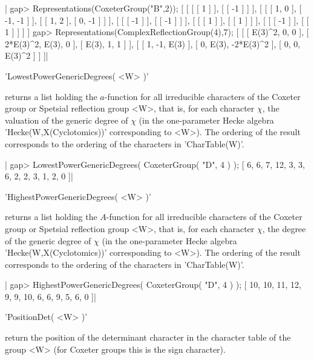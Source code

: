 |    gap> Representations(CoxeterGroup("B",2));
    [ [ [ [ 1 ] ], [ [ -1 ] ] ],
      [ [ [ 1, 0 ], [ -1, -1 ] ], [ [ 1, 2 ], [ 0, -1 ] ] ],
      [ [ [ -1 ] ], [ [ -1 ] ] ], [ [ [ 1 ] ], [ [ 1 ] ] ],
      [ [ [ -1 ] ], [ [ 1 ] ] ] ]
    gap> Representations(ComplexReflectionGroup(4),7);
    [ [ [ E(3)^2, 0, 0 ], [ 2*E(3)^2, E(3), 0 ], [ E(3), 1, 1 ] ],
      [ [ 1, -1, E(3) ], [ 0, E(3), -2*E(3)^2 ], [ 0, 0, E(3)^2 ] ] ]|


'LowestPowerGenericDegrees( <W> )'

returns  a list holding the $a$-function  for all irreducible characters of
the  Coxeter  group  or  Spetsial  reflection  group <W>, that is, for each
character  $\chi$, the  valuation of  the generic  degree of $\chi$ (in the
one-parameter  Hecke  algebra  'Hecke(W,X(Cyclotomics))'  corresponding  to
<W>).  The  ordering  of  the  result  corresponds  to  the ordering of the
characters in 'CharTable(W)'.

|    gap> LowestPowerGenericDegrees( CoxeterGroup( "D", 4 ) );
    [ 6, 6, 7, 12, 3, 3, 6, 2, 2, 3, 1, 2, 0 ]|


'HighestPowerGenericDegrees( <W> )'

returns  a list holding the $A$-function  for all irreducible characters of
the  Coxeter  group  or  Spetsial  reflection  group <W>, that is, for each
character  $\chi$,  the  degree  of  the  generic  degree of $\chi$ (in the
one-parameter  Hecke  algebra  'Hecke(W,X(Cyclotomics))'  corresponding  to
<W>).  The  ordering  of  the  result  corresponds  to  the ordering of the
characters in 'CharTable(W)'.

|    gap> HighestPowerGenericDegrees( CoxeterGroup( "D", 4 ) );
    [ 10, 10, 11, 12, 9, 9, 10, 6, 6, 9, 5, 6, 0 ]|


'PositionDet( <W> )'

return  the position of the determinant character in the character table of
the group <W> (for Coxeter groups this is the sign character).

